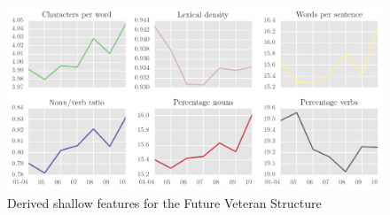 
\begin{figure}[htb]
\centering
\includegraphics[width=\textwidth]{../images/derived-shallow-features-in-v-corpus.png}
\caption{Derived shallow features for the Future Veteran Structure}
\label{fig:derived_shallow_V}
\end{figure}

